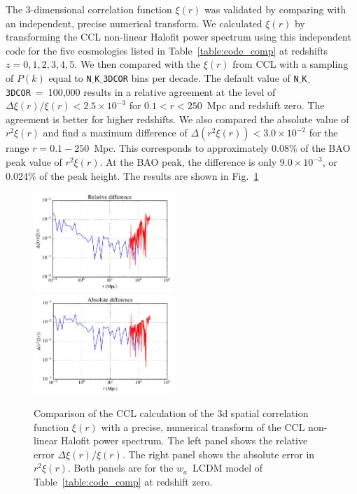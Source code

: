 \documentclass[\docopts]{\docclass}
\begin{document}
The 3-dimensional correlation function $\xi(r)$ was validated by comparing with an independent, precise numerical transform. We calculated $\xi(r)$ 
by transforming the CCL non-linear Halofit power spectrum using this independent code for the five cosmologies listed in Table~\ref{table:code_comp} at 
redshifts $z = 0,1,2,3,4,5$.  We then compared with the $\xi(r)$ from CCL with a sampling of $P(k)$ 
equal to {\tt N$\_$K$\_$3DCOR} bins per decade. The default value of {\tt N$\_$K$\_$3DCOR}~=~100,000 results in a relative agreement 
at the level of $\Delta \xi(r) / \xi(r) < 2.5 \times 10^{-3}$ for $0.1 < r < 250$~Mpc and redshift zero. The agreement is better for higher redshifts.
We also compared the absolute value of $r^2 \xi(r)$ and find a maximum difference of $\Delta (r^2 \xi(r)) < 3.0 \times 10^{-2}$ for the range 
$r = 0.1 - 250$~Mpc. This corresponds to approximately 0.08\% of the BAO peak value of $r^2 \xi(r)$. At the BAO peak, the difference is 
only $9.0 \times 10^{-3}$, or 0.024\% of the peak height. The results are shown in Fig.~\ref{fig:benchmark_xi}
%
\begin{figure}
\centering
\includegraphics[width=0.47\textwidth]{benchmark_xi_rel} ~~~
\includegraphics[width=0.47\textwidth]{benchmark_xi_abs} 
\caption{Comparison of the CCL calculation of the 3d spatial correlation function $\xi(r)$ with a precise, numerical transform of the CCL non-linear Halofit power spectrum. The left panel shows the relative error $\Delta \xi(r) / \xi(r)$. The right panel shows the absolute error in $r^2 \xi(r)$. Both panels are for the $w_a$~LCDM model of Table~\ref{table:code_comp} at redshift zero.}
\label{fig:benchmark_xi}
\end{figure}
\end{document}
